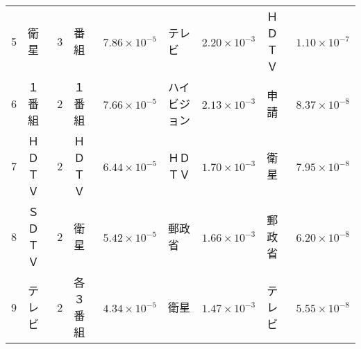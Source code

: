 \begin{table}[htbp]
\begin{center}
\begin{tabular}{|r|ll|ll|ll|ll|}
  5	  & 衛星     & \hspace{-2mm}3\hspace{-1.0mm}	  & 番組       & \hspace{-2mm}$7.86\times 10^{-5}$\hspace{-1.5mm} & テレビ       & \hspace{-2mm}$2.20\times 10^{-3}$\hspace{-1.5mm} & ＨＤＴＶ    & \hspace{-2mm}$1.10\times 10^{-7}$\hspace{-1.5mm} \\
  6	  & １番組   & \hspace{-2mm}2\hspace{-1.0mm}	  & １番組     & \hspace{-2mm}$7.66\times 10^{-5}$\hspace{-1.5mm} & ハイビジョン & \hspace{-2mm}$2.13\times 10^{-3}$\hspace{-1.5mm} & 申請         & \hspace{-2mm}$8.37\times 10^{-8}$\hspace{-1.5mm} \\
  7	  & ＨＤＴＶ & \hspace{-2mm}2\hspace{-1.0mm}	  & ＨＤＴＶ   & \hspace{-2mm}$6.44\times 10^{-5}$\hspace{-1.5mm} & ＨＤＴＶ     & \hspace{-2mm}$1.70\times 10^{-3}$\hspace{-1.5mm} & 衛星         & \hspace{-2mm}$7.95\times 10^{-8}$\hspace{-1.5mm} \\
  8	  & ＳＤＴＶ & \hspace{-2mm}2\hspace{-1.0mm}	  & 衛星       & \hspace{-2mm}$5.42\times 10^{-5}$\hspace{-1.5mm} & 郵政省       & \hspace{-2mm}$1.66\times 10^{-3}$\hspace{-1.5mm} & 郵政省      & \hspace{-2mm}$6.20\times 10^{-8}$\hspace{-1.5mm} \\
  9	  & テレビ   & \hspace{-2mm}2\hspace{-1.0mm}	  & 各３番組   & \hspace{-2mm}$4.34\times 10^{-5}$\hspace{-1.5mm} & 衛星         & \hspace{-2mm}$1.47\times 10^{-3}$\hspace{-1.5mm} & テレビ      & \hspace{-2mm}$5.55\times 10^{-8}$\hspace{-1.5mm} \\

\end{tabular}
\end{center}
\end{table}
